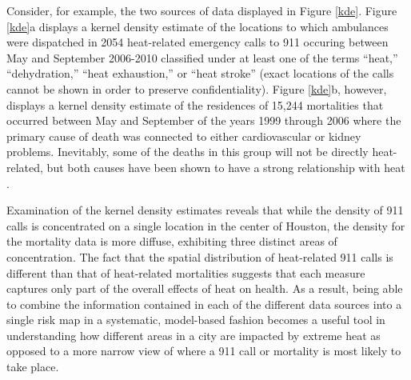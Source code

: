 \documentclass[final]{statsoc}
\begin{document}
Consider, for example, the two sources of data displayed in 
Figure \ref{kde}. Figure \ref{kde}a displays a kernel density estimate 
of the locations to which ambulances were dispatched in 2054 heat-related emergency calls to 911 occuring between
May and September 2006-2010 classified under at least one of the
terms ``heat,'' ``dehydration,'' ``heat exhaustion,'' or ``heat
stroke'' (exact locations of the calls cannot be shown in order
to preserve confidentiality). Figure \ref{kde}b, however, displays
a kernel density estimate of the residences of 15,244 mortalities
that occurred between May and September of the years 1999 through
2006 where the primary cause of death was connected to either
cardiovascular or kidney problems. Inevitably, some of the deaths in this group will not be directly heat-related, but both causes
have been shown to have a strong relationship with heat \citep{Kjellstrom2010}.

Examination of the kernel density estimates reveals that while the 
density of 911 calls is concentrated on a single location in the 
center of Houston, the density for the mortality data is more
diffuse, exhibiting three distinct areas of concentration. 
The fact that the spatial distribution of heat-related 911 calls
is different than that of heat-related mortalities suggests that
each measure captures only part of the overall effects of heat on
health. As a result, being able to combine the information
contained in each of the different data sources into a single risk
map in a systematic, model-based fashion becomes a useful tool
in understanding how different areas in a city are impacted 
by extreme heat as opposed to a more narrow view of where a
911 call or mortality is most likely to take place.
\end{document}
